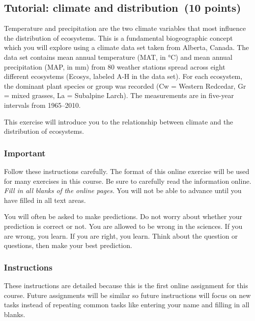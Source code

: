 \documentclass[11pt]{article}
\newcommand{\assignmentTitle}{Tutorial: climate and distribution}
\begin{document}
\thispagestyle{firstpage}

\subsection*{\assignmentTitle\ (10 points)}

Temperature and precipitation are the two climate variables that most
influence the distribution of ecosystems. This is a fundamental
biogeographic concept which you will explore using a climate data set
taken from Alberta, Canada. The data set contains mean annual
temperature (MAT, in °C) and mean annual precipitation (MAP, in mm) from
80 weather stations spread across eight different ecosystems (Ecosys,
labeled A-H in the data set). For each ecosystem, the dominant plant species or group
was recorded (Cw = Western Redcedar, Gr = mixed grasses, La = Subalpine
Larch). The measurements are in five-year intervals from 1965--2010.

This exercise will introduce you to the relationship between climate and 
the distribution of ecosystems. 

\subsubsection*{Important}

Follow these instructions carefully. The format of this online exercise will
be used for many exercises in this course.  Be sure to carefully read the 
information online.  \emph{Fill in all blanks of the online pages.} You will not be 
able to advance until you have filled in all text areas.

You will often be asked to make predictions. Do not worry about whether your
prediction is correct or not. You are allowed to be wrong in the sciences. If you are wrong,
you learn. If you are right, you learn.  Think about the question or questions, then make your
best prediction.

\subsubsection*{Instructions}

These instructions are detailed because this is the first online assignment for this course. Future assignments will be similar so future instructions will focus on new tasks instead of repeating common tasks like entering your name and filling in all blanks.
\end{document}
